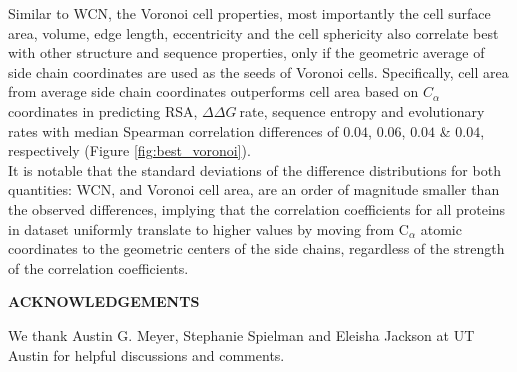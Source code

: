 \documentclass[11pt]{article}
\newcommand{\ddg}{$\Delta\Delta G~$}
\def\Acknowledgements{\bigskip  \bigskip \begin{center} \begin{large}
             \bf ACKNOWLEDGEMENTS \end{large}\end{center}}
\begin{document}
    Similar to WCN, the Voronoi cell properties, most importantly the cell surface area, volume, edge length, eccentricity and the cell sphericity also correlate best with other structure and sequence properties, only if the geometric average of side chain coordinates are used as the seeds of Voronoi cells. Specifically, cell area from average side chain coordinates outperforms cell area based on $C_\alpha$ coordinates in predicting RSA, \ddg rate, sequence entropy and evolutionary rates with median Spearman correlation differences of $0.04$, $0.06$, $0.04$ \& $0.04$, respectively (Figure \ref{fig:best_voronoi}). \\

    It is notable that the standard deviations of the difference distributions for both quantities: WCN, and Voronoi cell area, are an order of magnitude smaller than the observed differences, implying that the correlation coefficients for all proteins in dataset uniformly translate to higher values by moving from C$_\alpha$ atomic coordinates to the geometric centers of the side chains, regardless of the strength of the correlation coefficients. \\

\Acknowledgements

We thank Austin G. Meyer, Stephanie Spielman and Eleisha Jackson at UT Austin for helpful discussions and comments.





\newpage
\end{document}
